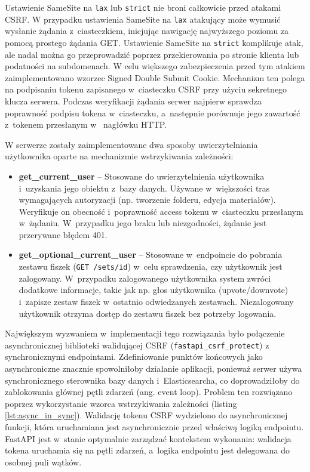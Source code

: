 Ustawienie SameSite na \texttt{lax} lub \texttt{strict} nie broni całkowicie przed atakami CSRF. 
W przypadku ustawienia SameSite na \texttt{lax} atakujący może wymusić wysłanie żądania z~ciasteczkiem, 
inicjując nawigację najwyższego poziomu za pomocą prostego żądania GET. Ustawienie SameSite na \texttt{strict} 
komplikuje atak, ale nadal można go przeprowadzić poprzez przekierowania po stronie klienta lub podatności na subdomenach.
W celu większego zabezpieczenia przed tym atakiem zaimplementowano wzorzec Signed Double Submit Cookie. Mechanizm ten 
polega na podpisaniu tokenu zapisanego w~ciasteczku CSRF przy użyciu sekretnego klucza serwera. Podczas weryfikacji żądania 
serwer najpierw sprawdza poprawność podpisu tokena w~ciasteczku, a~następnie porównuje jego zawartość z~tokenem przesłanym w~
nagłówku HTTP.

W serwerze zostały zaimplementowane dwa sposoby uwierzytelniania użytkownika oparte na mechanizmie wstrzykiwania zależności:
\begin{itemize}
    \item \textbf{get\_current\_user} -- Stosowane do uwierzytelnienia użytkownika i~uzyskania jego obiektu z~bazy danych. 
    Używane w~większości tras wymagających autoryzacji (np. tworzenie folderu, edycja materiałów). Weryfikuje on obecność 
    i~poprawność access tokenu w~ciasteczku przesłanym w~żądaniu. W~przypadku jego braku lub niezgodności, żądanie jest 
    przerywane błędem 401.
    \item \textbf{get\_optional\_current\_user} -- Stosowane w~endpoincie do pobrania zestawu fiszek (\texttt{GET /sets/{id}}) 
    w~celu sprawdzenia, czy użytkownik jest zalogowany. W~przypadku zalogowanego użytkownika system zwróci dodatkowe informacje, 
    takie jak np. głos użytkownika (upvote/downvote) i~zapisze zestaw fiszek w~ostatnio odwiedzanych zestawach. Niezalogowany użytkownik 
    otrzyma dostęp do zestawu fiszek bez potrzeby logowania.
\end{itemize}

Największym wyzwaniem w~implementacji tego rozwiązania było połączenie asynchronicznej biblioteki walidującej CSRF (\texttt{fastapi\_csrf\_protect}) 
z synchronicznymi endpointami. Zdefiniowanie punktów końcowych jako asynchroniczne znacznie spowolniłoby działanie aplikacji, ponieważ serwer 
używa synchronicznego sterownika bazy danych i~Elasticsearcha, co doprowadziłoby do zablokowania głównej pętli zdarzeń (ang. event loop). Problem 
ten rozwiązano poprzez wykorzystanie wzorca wstrzykiwania zależności (listing \ref{lst:async_in_sync}). Walidację tokenu CSRF wydzielono do asynchronicznej funkcji, która uruchamiana 
jest asynchronicznie przed właściwą logiką endpointu. FastAPI jest w~stanie optymalnie zarządzać kontekstem wykonania: walidacja tokena uruchamia 
się na pętli zdarzeń, a~logika endpointu jest delegowana do osobnej puli wątków.

